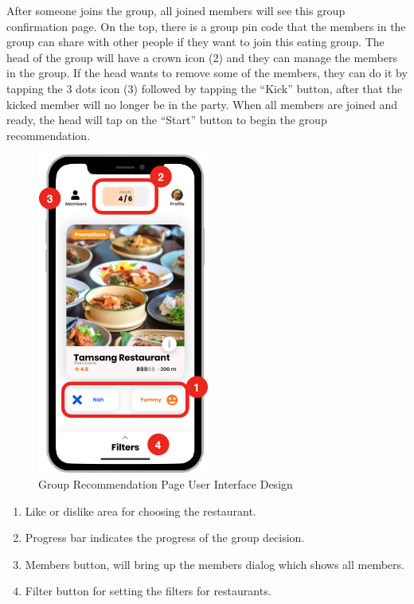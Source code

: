 \documentclass[12pt,oneside,openright,a4paper]{cpe-english-project}
\begin{document}
After someone joins the group, all joined members will see this group confirmation page. On the top, there is a group pin code that the members in the group can share with other people if they want to join this eating group. The head of the group will have a crown icon (2) and they can manage the members in the group. If the head wants to remove some of the members, they can do it by tapping the 3 dots icon (3) followed by tapping the “Kick” button, after that the kicked member will no longer be in the party. When all members are joined and ready, the head will tap on the “Start” button to begin the group recommendation.

\newpage
\begin{figure}[H]\centering
\includegraphics[height=300pt]{./images/3ui_GroupRecommendationPageUserInterfaceDesign.png}
\caption{Group Recommendation Page User Interface Design}\label{fig:3ui_GroupRecommendationPageUserInterfaceDesign}
\end{figure}

\begin{enumerate}
\item Like or dislike area for choosing the restaurant.
\item Progress bar indicates the progress of the group decision.
\item Members button, will bring up the members dialog which shows all members.
\item Filter button for setting the filters for restaurants.
\end{enumerate}
\end{document}
